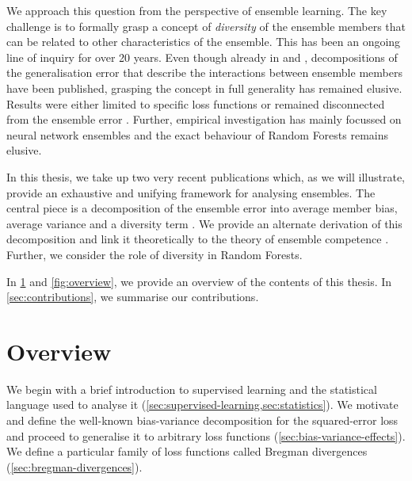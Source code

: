 \documentclass[
	twoside=false, %
]{kaobook}
\begin{document}
We approach this question from the perspective of ensemble learning. The key challenge is to formally grasp a concept of \textit{diversity} of the ensemble members that can be related to other characteristics of the ensemble.
This has been an ongoing line of inquiry for over 20 years. 
Even though already in \citeyear{krogh_NeuralNetworkEnsembles_1995} and \citeyear{ueda_GeneralizationErrorEnsemble_1996}, decompositions of the generalisation error that describe the interactions between ensemble members have been published, grasping the concept in full generality has remained elusive. Results were either limited to specific loss functions or remained disconnected from the ensemble error \cite{kuncheva_MeasuresDiversityClassifier_2003}.
Further, empirical investigation has mainly focussed on neural network ensembles
\cite{abe_BestDeepEnsembles_2022,abe_PathologiesPredictiveDiversity_2023,liu_EnsembleLearningNegative_1999,buschjager_GeneralizedNegativeCorrelation_2020,buschjager_ThereNoDoubleDescent_2021}
and the exact behaviour of Random Forests remains elusive.

In this thesis, we take up two very recent publications 
\cite{wood_UnifiedTheoryDiversity_2023, theisen_WhenAreEnsembles_2023}
which, as we will illustrate, provide an exhaustive and unifying framework for analysing ensembles. The central piece is a decomposition of the ensemble error into average member bias, average variance and a diversity term \cite{wood_UnifiedTheoryDiversity_2023}.
We provide an alternate derivation of this decomposition and link it theoretically to the theory of ensemble competence \cite{theisen_WhenAreEnsembles_2023}. Further, we consider the role of diversity in Random Forests.

In \cref{sec:overview} and \cref{fig:overview}, we provide an overview of the contents of this thesis. In \cref{sec:contributions}, we summarise our contributions.



\section{Overview}
\label{sec:overview}

We begin with a brief introduction to supervised learning and the statistical language used to analyse it
(\cf \cref{sec:supervised-learning,sec:statistics}). We motivate and define the well-known bias-variance decomposition for the squared-error loss and proceed to generalise it to arbitrary loss functions
(\cf \cref{sec:bias-variance-effects}).  
We define a particular family of loss functions called Bregman divergences
(\cf \cref{sec:bregman-divergences}).
\end{document}
